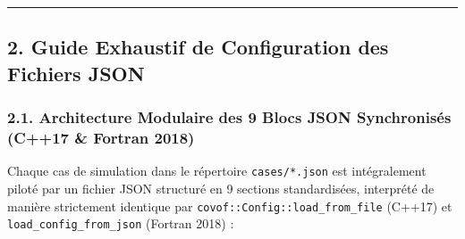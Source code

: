 \documentclass[
  10pt,
]{article}
\begin{document}
\begin{center}\rule{0.5\linewidth}{0.5pt}\end{center}

\subsection{2. Guide Exhaustif de Configuration des Fichiers
JSON}\label{guide-exhaustif-de-configuration-des-fichiers-json}

\subsubsection{2.1. Architecture Modulaire des 9 Blocs JSON Synchronisés
(C++17 \& Fortran
2018)}\label{architecture-modulaire-des-9-blocs-json-synchronisuxe9s-c17-fortran-2018}

Chaque cas de simulation dans le répertoire \texttt{cases/*.json} est
intégralement piloté par un fichier JSON structuré en 9 sections
standardisées, interprété de manière strictement identique par
\texttt{covof::Config::load\_from\_file} (C++17) et
\texttt{load\_config\_from\_json} (Fortran 2018) :
\end{document}
